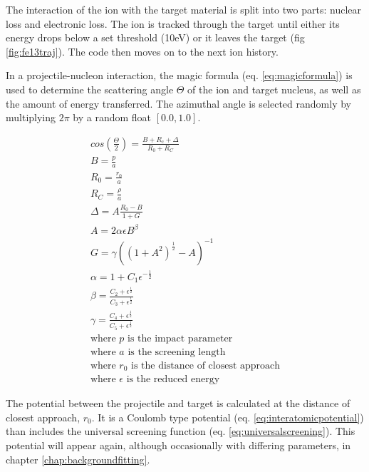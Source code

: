 The interaction of the ion with the target material is split into two parts: nuclear loss and electronic loss.  The ion is tracked through the target until either its energy drops below a set threshold (10eV) or it leaves the target (fig \ref{fig:fe13traj}).  The code then moves on to the next ion history.

In a projectile-nucleon interaction, the magic formula (eq. \ref{eq:magicformula})\cite{srimbook} is used to determine the scattering angle $\Theta$ of the ion and target nucleus, as well as the amount of energy transferred.  The azimuthal angle is selected randomly by multiplying $2\pi$ by a random float $[0.0, 1.0]$.

\begin{equation}
\begin{split}
cos \left(\frac{\Theta}{2}\right) = \frac{B + R_c + \Delta}{R_0 + R_C} \\
B = \frac{p}{a} \\
R_0 = \frac{r_0}{a} \\
R_C = \frac{\rho}{a} \\
\Delta = A \frac{R_0 - B}{1 + G} \\
A = 2 \alpha \epsilon B^\beta \\
G = \gamma \left(\left(1+A^2\right)^{\frac{1}{2}}-A\right)^{-1} \\
\alpha = 1 + C_1 \epsilon^{-\frac{1}{2}} \\
\beta = \frac{C_2 + \epsilon^{\frac{1}{2}}}{C_3 + \epsilon^{\frac{1}{2}}} \\
\gamma = \frac{C_4 + \epsilon^{\frac{1}{2}}}{C_5 + \epsilon^{\frac{1}{2}}} \\
\text{where } p \text{ is the impact parameter} \\
\text{where } a \text{ is the screening length} \\
\text{where } r_0 \text{ is the distance of closest approach} \\
\text{where } \epsilon \text{ is the reduced energy} 
\end{split}
\label{eq:magicformula}
\end{equation}

The potential between the projectile and target is calculated at the distance of closest approach, $r_0$.  It is a Coulomb type potential (eq. \ref{eq:interatomicpotential}) than includes the universal screening function (eq. \ref{eq:universalscreening}).  This potential will appear again, although occasionally with differing parameters, in chapter \ref{chap:backgroundfitting}.

